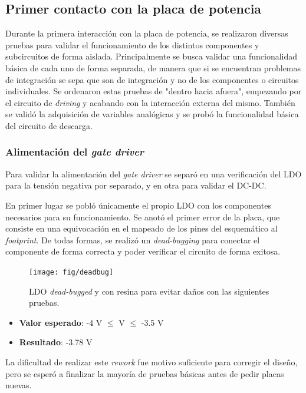 \subsection{Primer contacto con la placa de potencia}

Durante la primera interacción con la placa de potencia, se realizaron diversas pruebas para validar el funcionamiento de los distintos componentes y subcircuitos de forma aislada. Principalmente se busca validar una funcionalidad básica de cada uno de forma separada, de manera que si se encuentran problemas de integración se sepa que son de integración y no de los componentes o circuitos individuales. Se ordenaron estas pruebas de "dentro hacia afuera", empezando por el circuito de \textit{driving} y acabando con la interacción externa del mismo. También se validó la adquisición de variables analógicas y se probó la funcionalidad básica del circuito de descarga.


\subsubsection{Alimentación del \textit{gate driver}}

Para validar la alimentación del \textit{gate driver} se separó en una verificación del LDO para la tensión negativa por separado, y en otra para validar el DC-DC.

En primer lugar se pobló únicamente el propio LDO con los componentes necesarios para su funcionamiento. Se anotó el primer error de la placa, que consiste en una equivocación en el mapeado de los pines del esquemático al \textit{footprint}. De todas formas, se realizó un \textit{dead-bugging} para conectar el componente de forma correcta y poder verificar el circuito de forma exitosa.

\begin{figure}[H]
	\centering
	\texttt{[image: fig/deadbug]}
	\caption{LDO \textit{dead-bugged} y con resina para evitar daños con las siguientes pruebas.}
\end{figure}

\begin{itemize}
	\item \textbf{Valor esperado}: -4 V $\le$ V $\le$ -3.5 V
	\item \textbf{Resultado}: -3.78 V
\end{itemize}


La dificultad de realizar este \textit{rework} fue motivo suficiente para corregir el diseño, pero se esperó a finalizar la mayoría de pruebas básicas antes de pedir placas nuevas.


